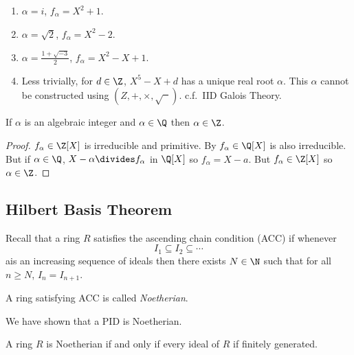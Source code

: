 \documentclass[a4paper]{article}
\theoremstyle{definition}
\begin{document}
\begin{eg}\leavevmode
  \begin{enumerate}
  \item \(\alpha = i\), \(f_\alpha = X^2 + 1\).
  \item \(\alpha = \sqrt 2\), \(f_\alpha = X^2 - 2\).
  \item \(\alpha = \frac{1 + \sqrt{-3}}{2}\), \(f_\alpha = X^2 - X + 1\).
  \item Less trivially, for \(d \in \Z\), \(X^5 - X + d\) has a unique real root \(\alpha\). This \(\alpha\) cannot be constructed using \((Z, +, \times, \sqrt{\phantom{x}})\). c.f.\ IID Galois Theory.
  \end{enumerate}
\end{eg}

\begin{lemma}
  If \(\alpha\) is an algebraic integer and \(\alpha \in \Q\) then \(\alpha \in \Z\).
\end{lemma}

\begin{proof}
  \(f_\alpha \in \Z[X]\) is irreducible and primitive. By  \(f_\alpha \in \Q[X]\) is also irreducible. But if \(\alpha \in \Q\), \(X - \alpha \divides f_\alpha\) in \(\Q[X]\) so \(f_\alpha = X - a\). But \(f_\alpha \in \Z[X]\) so \(\alpha \in \Z\).
\end{proof}

\subsection{Hilbert Basis Theorem}

Recall that a ring \(R\) satisfies the ascending chain condition (ACC) if whenever
\[
  I_1 \subseteq I_2 \subseteq \cdots
\]
ais an increasing sequence of ideals then there exists \(N \in \N\) such that for all \(n \geq N\), \(I_n = I_{n + 1}\).

A ring satisfying ACC is called \emph{Noetherian}.

We have shown that a PID is Noetherian.

\begin{lemma}
  A ring \(R\) is Noetherian if and only if every ideal of \(R\) if finitely generated.
\end{lemma}
\end{document}
